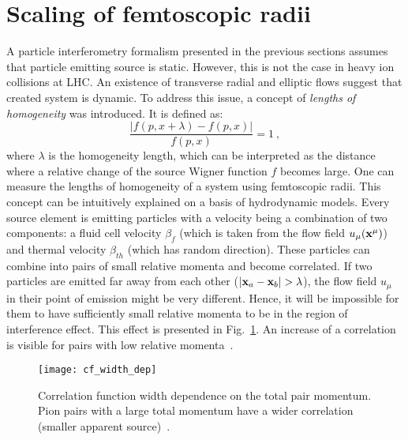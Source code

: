   \section{Scaling of femtoscopic radii}
  \label{sec:pi-scaling}
    A particle interferometry formalism presented in the previous sections assumes that particle emitting source is static.
    However, this is not the case in heavy ion collisions at LHC.
    An existence of transverse radial and elliptic flows suggest that created system is dynamic.
    To address this issue, a concept of \textit{lengths of homogeneity} was introduced.
    It is defined as:
    \begin{equation}
      \frac{|f(p,x + \lambda) - f(p,x)|}{f(p,x)} = 1~,
    \end{equation}
    where $\lambda$ is the homogeneity length, which can be interpreted as the distance where a relative change of the source Wigner function $f$ becomes large.
    One can measure the lengths of homogeneity of a system using femtoscopic radii.
    This concept can be intuitively explained on a basis of hydrodynamic models.
    Every source element is emitting particles with a velocity being a combination of two components: a fluid cell velocity $\beta_f$ (which is taken from the flow field $u_{\mu}(\mathbf{x^{\mu}})$) and thermal velocity $\beta_{th}$ (which has random direction).
    These particles can combine into pairs of small relative momenta and become correlated.
    If two particles are emitted far away from each other ($|\mathbf{x}_a - \mathbf{x}_b| > \lambda$), the flow field $u_\mu$ in their point of emission might be very different.
    Hence, it will be impossible for them to have sufficiently small relative momenta to be in the region of interference effect.
    This effect is presented in Fig.~\ref{fig:cf_width}.
    An increase of a correlation is visible for pairs with low relative momenta~\cite{drkisiel}.
    \begin{figure}[h]
      \centering
      \texttt{[image: cf\_width\_dep]}
      \caption{Correlation function width dependence on the total pair momentum. Pion pairs with a large total momentum have a wider correlation (smaller apparent source)~\cite{pratt_pion}.}
      \label{fig:cf_width}
    \end{figure}
    \FloatBarrier
